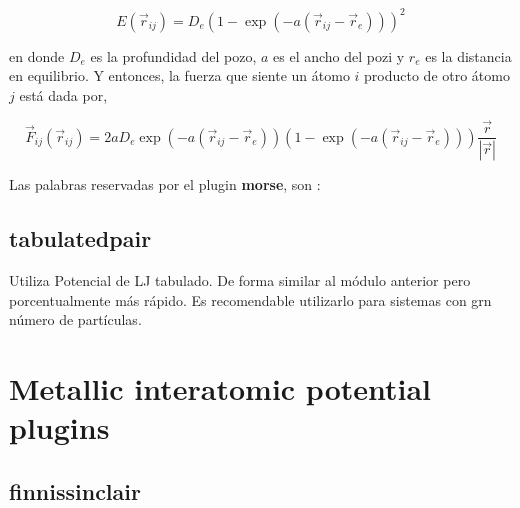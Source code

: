 $$E(\vec{r}_{ij}) = D_e\left(1-\exp(-a(\vec{r}_{ij}-\vec{r}_e))\right)^2$$

en donde $D_e$ es la profundidad del pozo, $a$ es el ancho del pozi y $r_e$ es
la distancia en equilibrio. Y entonces, la fuerza que siente un \'atomo $i$
producto de otro \'atomo $j$ est\'a dada por,

$$\vec{F}_{ij} ( \vec{r}_{ij}) =
2aD_e\exp(-a(\vec{r}_{ij}-\vec{r}_e))\left(1-\exp(-a(\vec{r}_{ij}-\vec{r}
_e))\right)\frac{\vec{r}}{|\vec{r}|}$$

Las palabras reservadas por el plugin \textbf{morse}, son :



\subsection{tabulatedpair}
Utiliza Potencial de LJ tabulado. De forma similar al m\'odulo anterior pero
porcentualmente m\'as r\'apido. Es recomendable utilizarlo para sistemas con grn
n\'umero de part\'iculas.


\section{Metallic interatomic potential plugins}

\subsection{finnissinclair}

